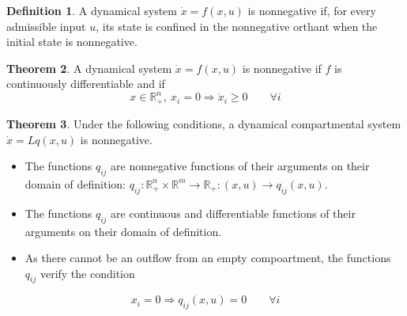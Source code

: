 \documentclass[12pt, openany]{report}
\theoremstyle{definition}
\newtheorem{thm}{Theorem}[chapter]
\newtheorem{definition}[thm]{Definition}
\newcommand{\R}{\mathbb{R}}
\begin{document}
\begin{definition}
    A dynamical system $\dot x=f(x,u)$ is nonnegative if, for every admissible input $u$, its state is confined in the nonnegative orthant when the initial state is nonnegative. 
\end{definition}
\begin{thm}
    A dynamical system $\dot x=f(x,u)$ is nonnegative if $f$ is continuously differentiable and if 
    \begin{equation}
        x\in \R^n_+, \: x_i=0\Longrightarrow \dot x_i\ge 0\qquad \forall i
    \end{equation}
\end{thm}
\begin{thm}
    Under the following conditions, a dynamical compartmental system $\dot x= Lq(x,u)$ is nonnegative.
    \begin{itemize}
        \item The functions $q_{ij}$ are nonnegative functions of their arguments on their domain of definition: $q_{ij}:\R^n_+\times \R^m\rightarrow \R_+: (x,u)\rightarrow q_{ij}(x,u)$.
        \item The functions $q_{ij}$ are continuous and differentiable functions of their arguments on their domain of definition.
        \item As there cannot be an outflow from an empty compoartment, the functions $q_{ij}$ verify the condition 
    \end{itemize}
    \begin{equation}
        x_i=0\Longrightarrow q_{ij}(x,u)=0\qquad \forall i
    \end{equation}
\end{thm}
\end{document}
